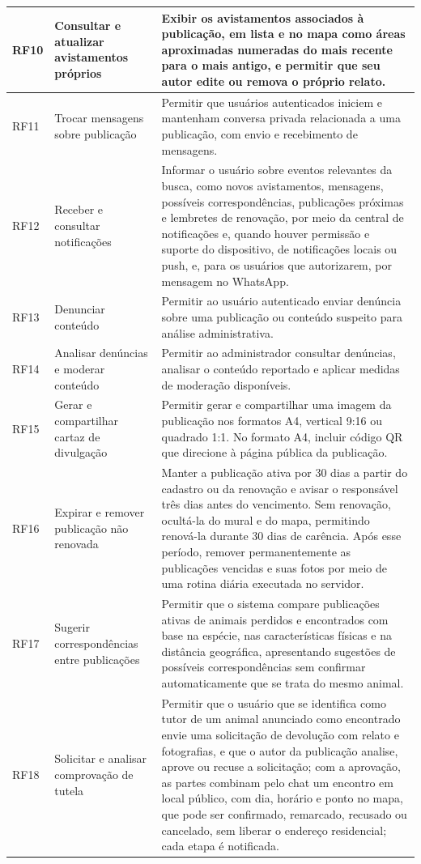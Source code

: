 {\begin{longtable}{|>{\centering\arraybackslash}p{1.3cm}|>{\raggedright\arraybackslash}p{4.2cm}|>{\raggedright\arraybackslash}p{8.8cm}|}
RF10 & Consultar e atualizar avistamentos próprios & Exibir os avistamentos associados à publicação, em lista e no mapa como áreas aproximadas numeradas do mais recente para o mais antigo, e permitir que seu autor edite ou remova o próprio relato. \\ \hline
RF11 & Trocar mensagens sobre publicação & Permitir que usuários autenticados iniciem e mantenham conversa privada relacionada a uma publicação, com envio e recebimento de mensagens. \\ \hline
RF12 & Receber e consultar notificações & Informar o usuário sobre eventos relevantes da busca, como novos avistamentos, mensagens, possíveis correspondências, publicações próximas e lembretes de renovação, por meio da central de notificações e, quando houver permissão e suporte do dispositivo, de notificações locais ou push, e, para os usuários que autorizarem, por mensagem no WhatsApp. \\ \hline
RF13 & Denunciar conteúdo & Permitir ao usuário autenticado enviar denúncia sobre uma publicação ou conteúdo suspeito para análise administrativa. \\ \hline
RF14 & Analisar denúncias e moderar conteúdo & Permitir ao administrador consultar denúncias, analisar o conteúdo reportado e aplicar medidas de moderação disponíveis. \\ \hline
RF15 & Gerar e compartilhar cartaz de divulgação & Permitir gerar e compartilhar uma imagem da publicação nos formatos A4, vertical 9:16 ou quadrado 1:1. No formato A4, incluir código QR que direcione à página pública da publicação. \\ \hline
RF16 & Expirar e remover publicação não renovada & Manter a publicação ativa por 30 dias a partir do cadastro ou da renovação e avisar o responsável três dias antes do vencimento. Sem renovação, ocultá-la do mural e do mapa, permitindo renová-la durante 30 dias de carência. Após esse período, remover permanentemente as publicações vencidas e suas fotos por meio de uma rotina diária executada no servidor. \\ \hline
RF17 & Sugerir correspondências entre publicações & Permitir que o sistema compare publicações ativas de animais perdidos e encontrados com base na espécie, nas características físicas e na distância geográfica, apresentando sugestões de possíveis correspondências sem confirmar automaticamente que se trata do mesmo animal. \\ \hline
RF18 & Solicitar e analisar comprovação de tutela & Permitir que o usuário que se identifica como tutor de um animal anunciado como encontrado envie uma solicitação de devolução com relato e fotografias, e que o autor da publicação analise, aprove ou recuse a solicitação; com a aprovação, as partes combinam pelo chat um encontro em local público, com dia, horário e ponto no mapa, que pode ser confirmado, remarcado, recusado ou cancelado, sem liberar o endereço residencial; cada etapa é notificada. \\ \hline

\end{longtable}}

